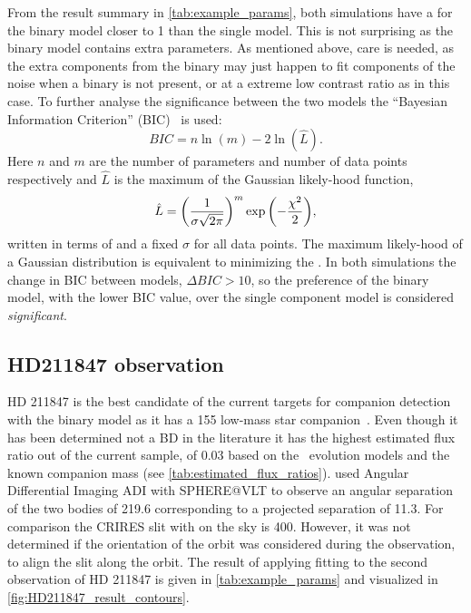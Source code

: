 From the result summary in \cref{tab:example_params}, both simulations have a \textchisquaredreduced{} for the binary model closer to 1 than the single model.
This is not surprising as the binary model contains extra parameters.
As mentioned above, care is needed, as the extra components from the binary may just happen to fit components of the noise when a binary is not present, or at a extreme low contrast ratio as in this case.
To further analyse the significance between the two models the ``Bayesian Information Criterion'' ({BIC})~\citep{schwarz_estimating_1978} is used:
\begin{equation}
{BIC} = n\ln{(m)} - 2\ln{(\hat{L})}.
\end{equation}
Here \(n\) and \(m\) are the number of parameters and number of data points respectively and \(\hat{L}\) is the maximum of the Gaussian likely-hood function, 
\begin{equation}
\hat{L} = {\left(\frac{1}{\sigma \sqrt{2\pi}}\right)}^{m} \exp{\left(-\frac{{\chi}^{2}}{2}\right)},
\end{equation}
written in terms of \textchisquared{} and a fixed \(\sigma\) for all data points.
The maximum likely-hood of a Gaussian distribution is equivalent to minimizing the \textchisquared{}.
In both simulations the change in {BIC} between models, \(\Delta {BIC} >10\), so the preference of the binary model, with the lower {BIC} value, over the single component model is considered \emph{significant}.

\subsection{HD211847 observation}
\label{subsec:results-hd211847}
{HD 211847} is the best candidate of the current targets for companion detection with the \textchisquared{} binary model as it has a 155\Mjup{} low-mass star companion~\citet{moutou_eccentricity_2017}.
Even though it has been determined not a {BD} in the literature it has the highest estimated flux ratio out of the current sample, of 0.03 based on the~\citet{baraffe_new_2015} evolution models and the known companion mass (see \cref{tab:estimated_flux_ratios}).
\citet{moutou_eccentricity_2017} used Angular Differential Imaging {ADI} with {SPHERE@VLT} to observe an angular separation of the two bodies of 219.6\mas{} corresponding to a projected separation of 11.3\AU{}. For comparison the {CRIRES} slit with on the sky is 400\mas.
However, it was not determined if the orientation of the orbit was considered during the observation, to align the slit along the orbit.
The result of applying \textchisquared{} fitting to the second observation of {HD 211847} is given in \cref{tab:example_params} and visualized in \cref{fig:HD211847_result_contours}.

